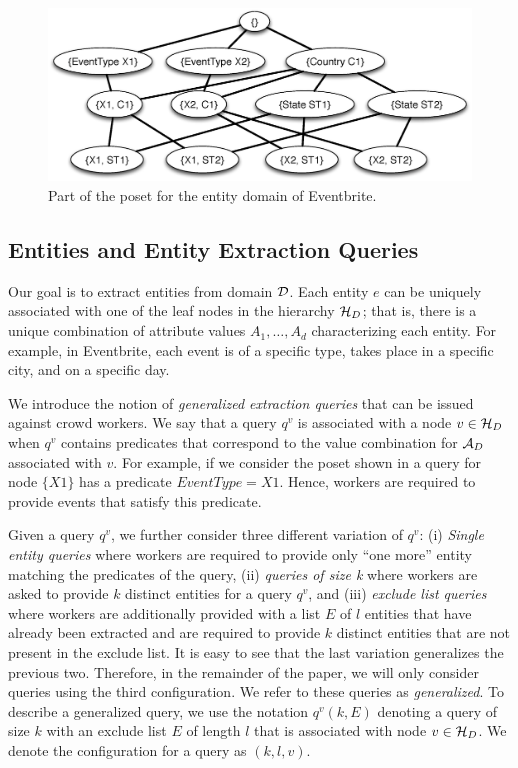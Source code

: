 \begin{figure}[h]
	\begin{center}
	\includegraphics[clip,scale=0.28]{figs/eventsExLattice.eps}
	\caption{Part of the poset for the entity domain of Eventbrite.}
	\label{fig:eventslattice}
	\vspace{-15pt}
	\end{center}
\end{figure}

\subsection{Entities and Entity Extraction Queries}
\label{sec:queries}

 Our goal is to extract entities from domain $\mathcal{D}$. Each entity $e$ can be uniquely associated with one of the leaf nodes in the hierarchy $\mathcal{H}_D$; that is, there is a unique combination of attribute values $A_1, \ldots, A_d$ characterizing each entity. For example, in Eventbrite, each event is of a specific type, takes place in a specific city, and on a specific day.

 We introduce the notion of {\em generalized extraction queries} that can be issued against crowd workers. We say that a query $q^v$ is associated with a node $v \in \mathcal{H}_D$ when $q^v$ contains predicates that correspond to the value combination for $\mathcal{A}_D$ associated with $v$. For example, if we consider the poset shown in  a query for node $\{X1\}$ has a predicate $EventType = X1$. Hence, workers are required to provide events that satisfy this predicate.

Given a query $q^v$, we further consider three different variation of $q^v$: (i) {\em Single entity queries} where workers are required to provide only ``one more'' entity matching the predicates of the query, (ii) {\em queries of size k} where workers are asked to provide $k$ distinct entities for a query $q^v$, and (iii) {\em exclude list queries} where workers are additionally provided with a list $E$ of $l$ entities that have already been extracted and are required to provide $k$ distinct entities that are not present in the exclude list. It is easy to see that the last variation generalizes the previous two. Therefore, in the remainder of the paper, we will only consider queries using the third configuration. We refer to these queries as {\em generalized}. To describe a generalized query, we use the notation $q^v(k,E)$ denoting a query of size $k$ with an exclude list $E$ of length $l$ that is associated with node $v \in \mathcal{H}_D$. We denote the configuration for a query as $(k,l,v)$. 

